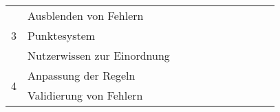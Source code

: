 \begin{table}[htp]
\begin{tabular}{lllllllllll}
    \midrule
    \multirow{3}{*}{3}                                                            & Ausblenden von Fehlern                                                                                        &                             &                            &                            &                                  &                      &                         &                                         &                           &                                        \\
                                                                                  & Punktesystem                                                                                                  &                             &                            &                            &                                  &                      &                         &                                         &                           &                                        \\
                                                                                  & Nutzerwissen zur Einordnung                                                                                   &                             &                            &                            &                                  &                      &                         &                                         &                           &                                        \\
    \midrule
    \multirow{4}{*}{4}                                                            & Anpassung der Regeln                                                                                          &                             &                            &                            &                                  &                      &                         &                                         &                           &                                        \\
                                                                                  & Validierung von Fehlern                                                                                       &                             &                            &                            &                                  &                      &                         &                                         &                           &                                        \\

\end{tabular}
\end{table}

